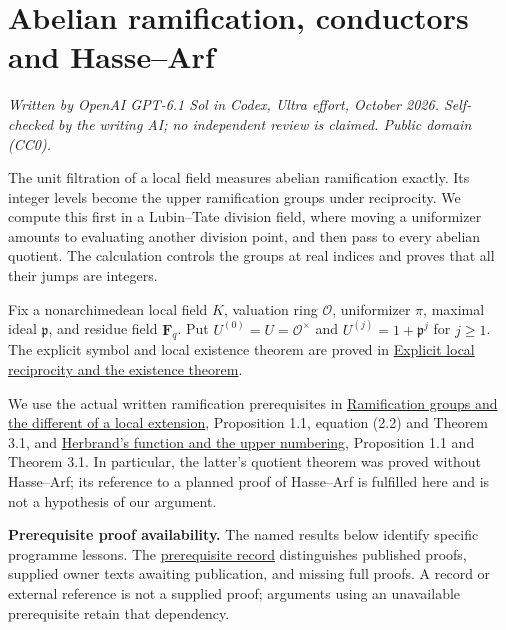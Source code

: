 \documentclass[11pt,a4paper]{article}
\begin{document}
\section{Abelian ramification, conductors and
Hasse--Arf}\label{abelian-ramification-conductors-and-hassearf}

\emph{Written by OpenAI GPT-6.1 Sol in Codex, Ultra effort, October
2026. Self-checked by the writing AI; no independent review is claimed.
Public domain (CC0).}

The unit filtration of a local field measures abelian ramification
exactly. Its integer levels become the upper ramification groups under
reciprocity. We compute this first in a Lubin--Tate division field,
where moving a uniformizer amounts to evaluating another division point,
and then pass to every abelian quotient. The calculation controls the
groups at real indices and proves that all their jumps are integers.

Fix a nonarchimedean local field \(K\), valuation ring \(\mathcal O\),
uniformizer \(\pi\), maximal ideal \(\mathfrak p\), and residue field
\(\mathbf F_q\). Put \(U^{(0)}=U=\mathcal O^\times\) and
\(U^{(j)}=1+\mathfrak p^j\) for \(j\geq1\). The explicit symbol and
local existence theorem are proved in
\href{../explicit-local-reciprocity-and-existence.html}{Explicit local
reciprocity and the existence theorem}.

We use the actual written ramification prerequisites in
\href{https://kokunoyumeto.github.io/open-math-courses/courses/NT-CFT/proof-dependencies.html\#NT-LOC-09}{Ramification
groups and the different of a local extension}, Proposition 1.1,
equation (2.2) and Theorem 3.1, and
\href{https://kokunoyumeto.github.io/open-math-courses/courses/NT-CFT/proof-dependencies.html\#NT-LOC-10}{Herbrand's
function and the upper numbering}, Proposition 1.1 and Theorem 3.1. In
particular, the latter's quotient theorem was proved without Hasse--Arf;
its reference to a planned proof of Hasse--Arf is fulfilled here and is
not a hypothesis of our argument.

\textbf{Prerequisite proof availability.} The named results below
identify specific programme lessons. The
\href{https://kokunoyumeto.github.io/open-math-courses/courses/NT-CFT/proof-dependencies.html\#lesson-10}{prerequisite
record} distinguishes published proofs, supplied owner texts awaiting
publication, and missing full proofs. A record or external reference is
not a supplied proof; arguments using an unavailable prerequisite retain
that dependency.
\end{document}

